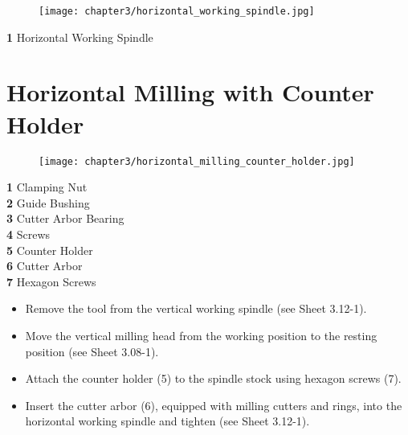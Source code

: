 \begin{figure}[h]
    \centering
    \texttt{[image: chapter3/horizontal\_working\_spindle.jpg]}
    \label{fig:horizontal_working_spindle}
\end{figure}

\textbf{1} \quad Horizontal Working Spindle

\vspace{.5cm}


\section{Horizontal Milling with Counter Holder}

\begin{figure}[h]
    \centering
    \texttt{[image: chapter3/horizontal\_milling\_counter\_holder.jpg]}
    \label{fig:horizontal_milling_counter_holder}
\end{figure}

\textbf{1} \quad Clamping Nut \\
\textbf{2} \quad Guide Bushing \\
\textbf{3} \quad Cutter Arbor Bearing \\
\textbf{4} \quad Screws \\
\textbf{5} \quad Counter Holder \\
\textbf{6} \quad Cutter Arbor \\
\textbf{7} \quad Hexagon Screws

\vspace{0.3cm}

\begin{itemize}
    \item Remove the tool from the vertical working spindle (see Sheet 3.12-1).
    \item Move the vertical milling head from the working position to the resting position (see Sheet 3.08-1).
    \item Attach the counter holder (5) to the spindle stock using hexagon screws (7).
    \item Insert the cutter arbor (6), equipped with milling cutters and rings, into the horizontal working spindle and tighten (see Sheet 3.12-1).
\end{itemize}


